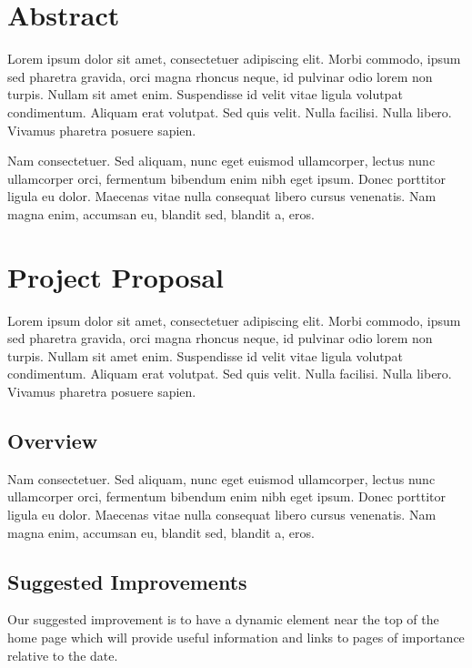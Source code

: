 \documentclass[10pt]{article}
\begin{document}
\begin{multicols}{2}

\section*{Abstract}
Lorem ipsum dolor sit amet, consectetuer adipiscing elit. Morbi commodo, ipsum sed pharetra gravida, orci magna rhoncus neque, id pulvinar odio lorem non turpis. Nullam sit amet enim. Suspendisse id velit vitae ligula volutpat condimentum. Aliquam erat volutpat. Sed quis velit. Nulla facilisi. Nulla libero. Vivamus pharetra posuere sapien. 

Nam consectetuer. Sed aliquam, nunc eget euismod ullamcorper, lectus nunc ullamcorper orci, fermentum bibendum enim nibh eget ipsum. Donec porttitor ligula eu dolor. Maecenas vitae nulla consequat libero cursus venenatis. Nam magna enim, accumsan eu, blandit sed, blandit a, eros.

\section*{Project Proposal}
Lorem ipsum dolor sit amet, consectetuer adipiscing elit. Morbi commodo, ipsum sed pharetra gravida, orci magna rhoncus neque, id pulvinar odio lorem non turpis. Nullam sit amet enim. Suspendisse id velit vitae ligula volutpat condimentum. Aliquam erat volutpat. Sed quis velit. Nulla facilisi. Nulla libero. Vivamus pharetra posuere sapien.

\subsection*{Overview}
Nam consectetuer. Sed aliquam, nunc eget euismod ullamcorper, lectus nunc ullamcorper orci, fermentum bibendum enim nibh eget ipsum. Donec porttitor ligula eu dolor. Maecenas vitae nulla consequat libero cursus venenatis. Nam magna enim, accumsan eu, blandit sed, blandit a, eros. 

\subsection*{Suggested Improvements}
Our suggested improvement is to have a dynamic element near the top of the home page which will provide useful information and links to pages of importance relative to the date.\\


\end{multicols}
\end{document}
